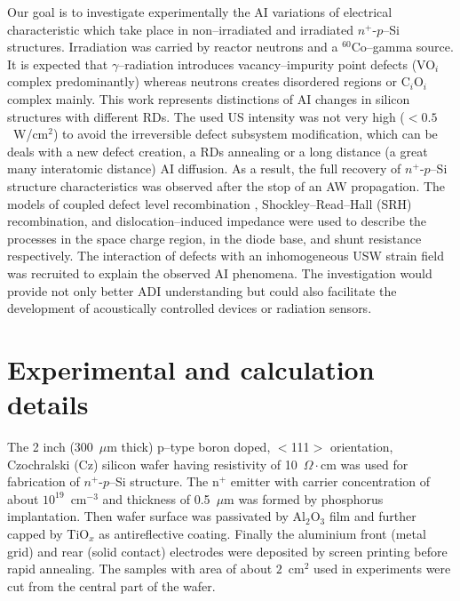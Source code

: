 \documentclass[aip,jap,reprint]{revtex4-1}
\begin{document}
Our goal is to investigate experimentally the AI variations of electrical characteristic which take place in non--irradiated and irradiated $n^+$-$p$--Si structures.
Irradiation was carried by reactor neutrons and a $^{60}$Co--gamma source.
It is expected that $\gamma$--radiation introduces vacancy--impurity point defects (VO$_i$ complex predominantly) \cite{NIEL:Jafari,Gamma:Prabhakara,NIEL:Moll}
whereas neutrons creates disordered regions \cite{Neutron:Arutyunov} or C$_i$O$_i$ complex \cite{NIEL:Moll} mainly.
This work represents distinctions of AI changes in silicon structures with different RDs.
The used US intensity was not very high ($<0.5$~W/cm$^2$) to avoid the irreversible defect subsystem modification, which can be deals with a new defect creation, a RDs annealing or a long distance (a great many interatomic distance) AI diffusion.
As a result, the full recovery of $n^+$-$p$--Si structure characteristics was observed after the stop of an AW propagation.
The models of coupled defect level recombination \cite{CDLR:JAP1995,CDLR:JAP}, Shockley--Read--Hall (SRH) recombination, and dislocation--induced impedance \cite{Rsh:Gopal2003,Rsh:Gopal2004} were used to describe the processes in the space charge region,  in the diode base, and shunt resistance respectively.
The interaction of defects with an inhomogeneous USW strain ﬁeld \cite{MirzadeJAP2011,PeleshchakUJF2016} was recruited to explain the observed AI phenomena.
The investigation would provide not only better ADI understanding but could also facilitate the development of acoustically controlled devices or radiation sensors.



\section{Experimental and calculation details}

The 2 inch (300~$\mu$m thick) p--type boron doped, $<$111$>$ orientation, Czochralski (Cz) silicon wafer having resistivity of 10~$\Omega\cdot$cm was used for fabrication of  $n^+$-$p$--Si structure.
The n$^+$ emitter with carrier concentration of about $10^{19}$~cm$^{-3}$ and thickness of 0.5~$\mu$m was formed by phosphorus implantation.
Then wafer surface was passivated by Al$_2$O$_3$ film and further capped by TiO$_x$ as antireflective coating.
Finally the aluminium front (metal grid) and rear (solid contact) electrodes were deposited by screen printing before rapid annealing.
The samples with area of about $2$~cm$^{2}$ used in experiments were cut from the central part of the wafer.
\end{document}
